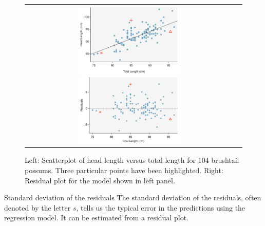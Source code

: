 \begin{figure}[h]
   \centering
  \begin{tabular}{cc}
   \includegraphics[width=0.5\textwidth]{ch_regr_simple_linear/figures/scattHeadLTotalLLine/scattHeadLTotalLLine}%
   \includegraphics[width=0.5\textwidth]{ch_regr_simple_linear/figures/scattHeadLTotalLResidualPlot/scattHeadLTotalLResidualPlot}
\end{tabular}
   \caption{Left: Scatterplot of head length versus total length for 104 brushtail possums.  Three particular points have been highlighted.  Right: Residual plot for the model shown in left panel.  }
   \label{scattHeadLTotalLResidualPlotReproduced}
\end{figure}

\begin{onebox}{Standard deviation of the residuals}
The standard deviation of the residuals, often denoted by the letter $s$, tells us the typical error in the predictions using the regression model.  It can be estimated from a residual plot.
\end{onebox}

\D{\newpage}

